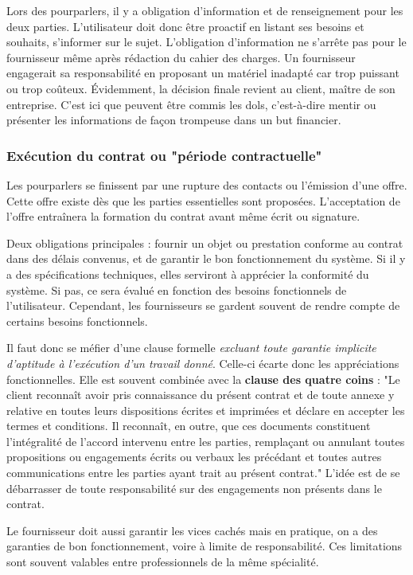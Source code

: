 \documentclass[fleqn,letterpaper, 12pt]{article}
\begin{document}
	Lors des pourparlers, il y a obligation d'information et de renseignement pour les deux parties. L'utilisateur doit donc être proactif en listant ses besoins et souhaits, s'informer sur le sujet. L'obligation d'information ne s'arrête pas pour le fournisseur même après rédaction du cahier des charges. Un fournisseur engagerait sa responsabilité en proposant un matériel inadapté car trop puissant ou trop coûteux. Évidemment, la décision finale revient au client, maître de son entreprise. C'est ici que peuvent être commis les dols, c'est-à-dire mentir ou présenter les informations de façon trompeuse dans un but financier.
	
	\subsubsection{Exécution du contrat ou "période contractuelle"}
	
	Les pourparlers se finissent par une rupture des contacts ou l'émission d'une offre. Cette offre existe dès que les parties essentielles sont proposées. L'acceptation de l'offre entraînera la formation du contrat avant même écrit ou signature.
	
	Deux obligations principales : fournir un objet ou prestation conforme au contrat dans des délais convenus, et de garantir le bon fonctionnement du système. Si il y a des spécifications techniques, elles serviront à apprécier la conformité du système. Si pas, ce sera évalué en fonction des besoins fonctionnels de l'utilisateur. Cependant, les fournisseurs se gardent souvent de rendre compte de certains besoins fonctionnels.
	
	Il faut donc se méfier d'une clause formelle \emph{excluant toute garantie implicite d'aptitude à l'exécution d'un travail donné}. Celle-ci écarte donc les appréciations fonctionnelles. Elle est souvent combinée avec la \textbf{clause des quatre coins} : "Le client reconnaît avoir pris connaissance du présent contrat et de toute annexe y relative en toutes leurs dispositions écrites et imprimées et déclare en accepter les termes et conditions. Il reconnaît, en outre, que ces documents constituent l'intégralité de l'accord intervenu entre les parties, remplaçant ou annulant toutes propositions ou engagements écrits ou verbaux les précédant et toutes autres communications entre les parties ayant trait au présent contrat." L'idée est de se débarrasser de toute responsabilité sur des engagements non présents dans le contrat.
	
	Le fournisseur doit aussi garantir les vices cachés mais en pratique, on a des garanties de bon fonctionnement, voire à limite de responsabilité. Ces limitations sont souvent valables entre professionnels de la même spécialité.
	
\end{document}
